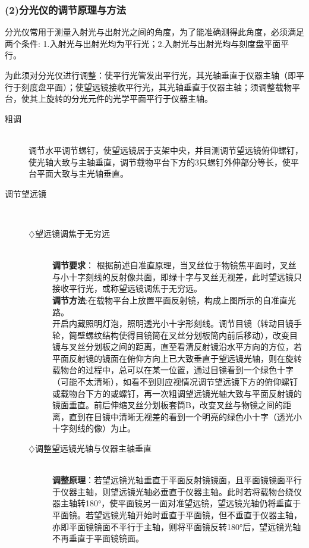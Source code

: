 \documentclass[11pt,a4paper,oneside]{article}
\begin{document}
\subsubsection*{(2)分光仪的调节原理与方法}
分光仪常用于测量入射光与出射光之间的角度，为了能准确测得此角度，必须满足两个条件:
1.入射光与出射光均为平行光；2.入射光与出射光均与刻度盘平面平行。

为此须对分光仪进行调整：使平行光管发出平行光，其光轴垂直于仪器主轴（即平行于刻度盘平面）；使望远镜接收平行光，其光轴垂直于仪器主轴；须调整载物平台，使其上旋转的分光元件的光学平面平行于仪器主轴。

\begin{description}
\item[粗调]\hspace*{\fill}\\ 调节水平调节螺钉，使望远镜居于支架中央，并目测调节望远镜俯仰螺钉，使光轴大致与主轴垂直，调节载物平台下方的3只螺钉外伸部分等长，使平台平面大致与主光轴垂直。
\item[调节望远镜]\hspace*{\fill}\\
	\begin{description}
	\item[$\diamondsuit$望远镜调焦于无穷远]\hspace*{\fill}\\
	\textbf{调节要求}： 根据前述自准直原理，当叉丝位于物镜焦平面时，叉丝与小十字刻线的反射像共面，即绿十字与叉丝无视差，此时望远镜只接收平行光，或称望远镜调焦于无穷远。\\ \textbf{调节方法}:在载物平台上放置平面反射镜，构成上图所示的自准直光路。\\开启内藏照明灯泡，照明透光小十字形刻线。调节目镜（转动目镜手轮，筒壁螺纹结构使得目镜筒在叉丝分划板筒内前后移动），改变目镜与叉丝分划板之间的距离，直至看清反射镜沿水平方向的方位，若平面反射镜的镜面在俯仰方向上已大致垂直于望远镜光轴，则在旋转载物台的过程中，总可以在某一位置，通过目镜看到一个绿色十字（可能不太清晰），如看不到则应视情况调节望远镜下方的俯仰螺钉或载物台下方的或螺钉，再一次粗调望远镜光轴大致与平面反射镜的镜面垂直。前后伸缩叉丝分划板套筒B，改变叉丝与物镜之间的距离，直到在目镜中清晰无视差的看到一个明亮的绿色小十字（透光小十字刻线的像）为止。
	\item[$\diamondsuit$调整望远镜光轴与仪器主轴垂直]\hspace*{\fill}\\ 
	\textbf{调整原理}：若望远镜光轴垂直于平面反射镜镜面，且平面镜镜面平行于仪器主轴，则望远镜光轴必垂直于仪器主轴。此时若将载物台绕仪器主轴转180°，使平面镜另一面对准望远镜，望远镜光轴仍将垂直于平面镜。若望远镜光轴开始时垂直于平面镜，但不垂直于仪器主轴，亦即平面镜镜面不平行于主轴，则将平面镜反转180°后，望远镜光轴不再垂直于平面镜镜面。\\

\end{description}
\end{description}
\end{document}
